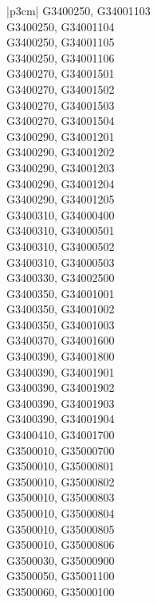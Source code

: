 \begin{customLongTable}{ |p{3cm}| }
G3400250, G34001103 \\ \hline
G3400250, G34001104 \\ \hline
G3400250, G34001105 \\ \hline
G3400250, G34001106 \\ \hline
G3400270, G34001501 \\ \hline
G3400270, G34001502 \\ \hline
G3400270, G34001503 \\ \hline
G3400270, G34001504 \\ \hline
G3400290, G34001201 \\ \hline
G3400290, G34001202 \\ \hline
G3400290, G34001203 \\ \hline
G3400290, G34001204 \\ \hline
G3400290, G34001205 \\ \hline
G3400310, G34000400 \\ \hline
G3400310, G34000501 \\ \hline
G3400310, G34000502 \\ \hline
G3400310, G34000503 \\ \hline
G3400330, G34002500 \\ \hline
G3400350, G34001001 \\ \hline
G3400350, G34001002 \\ \hline
G3400350, G34001003 \\ \hline
G3400370, G34001600 \\ \hline
G3400390, G34001800 \\ \hline
G3400390, G34001901 \\ \hline
G3400390, G34001902 \\ \hline
G3400390, G34001903 \\ \hline
G3400390, G34001904 \\ \hline
G3400410, G34001700 \\ \hline
G3500010, G35000700 \\ \hline
G3500010, G35000801 \\ \hline
G3500010, G35000802 \\ \hline
G3500010, G35000803 \\ \hline
G3500010, G35000804 \\ \hline
G3500010, G35000805 \\ \hline
G3500010, G35000806 \\ \hline
G3500030, G35000900 \\ \hline
G3500050, G35001100 \\ \hline
G3500060, G35000100 \\ \hline

\end{customLongTable}
